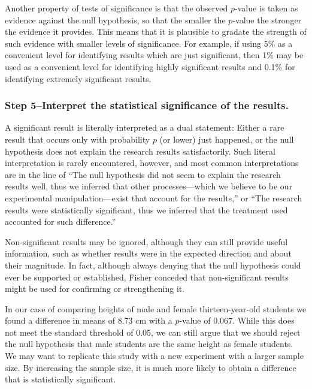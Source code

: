 \documentclass[
]{book}
\theoremstyle{definition}
\theoremstyle{definition}
\theoremstyle{definition}
\theoremstyle{definition}
\theoremstyle{remark}
\begin{document}
Another property of tests of significance is that the observed \(p\)-value is taken as evidence against the null hypothesis, so that the smaller the \(p\)-value the stronger the evidence it provides. This means that it is plausible to gradate the strength of such evidence with smaller levels of significance. For example, if using 5\% as a convenient level for identifying results which are just significant, then 1\% may be used as a convenient level for identifying highly significant results and 0.1\% for identifying extremely significant results.

\hypertarget{step-5interpret-the-statistical-significance-of-the-results.}{%
\subsubsection*{Step 5--Interpret the statistical significance of the results.}\label{step-5interpret-the-statistical-significance-of-the-results.}}

A significant result is literally interpreted as a dual statement: Either a rare result that occurs only with probability \(p\) (or lower) just happened, or the null hypothesis does not explain the research results satisfactorily. Such literal interpretation is rarely encountered, however, and most common interpretations are in the line of ``The null hypothesis did not seem to explain the research results well, thus we inferred that other processes---which we believe to be our experimental manipulation---exist that account for the results,'' or ``The research results were statistically significant, thus we inferred that the treatment used accounted for such difference.''

Non-significant results may be ignored, although they can still provide useful information, such as whether results were in the expected direction and about their magnitude. In fact, although always denying that the null hypothesis could ever be supported or established, Fisher conceded that non-significant results might be used for confirming or strengthening it.

In our case of comparing heights of male and female thirteen-year-old students we found a difference in means of 8.73 cm with a \(p\)-value of 0.067. While this does not meet the standard threshold of 0.05, we can still argue that we should reject the null hypothesis that male students are the same height as female students. We may want to replicate this study with a new experiment with a larger sample size. By increasing the sample size, it is much more likely to obtain a difference that is statistically significant.
\end{document}
